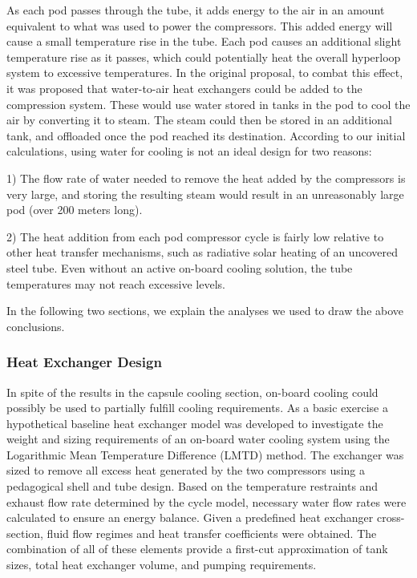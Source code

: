 \documentclass[heading.tex]{subfiles}
\begin{document}
As each pod passes through the tube, it adds energy to the air in an amount equivalent to what was used to power the compressors. This added energy will cause a small temperature rise in the tube. Each pod causes an additional slight temperature rise as it passes, which could potentially heat the overall hyperloop system to excessive temperatures. In the original proposal, to combat this effect, it was proposed that water-to-air heat exchangers could be added to the compression system. These would use water stored in tanks in the pod to cool the air by converting it to steam. The steam could then be stored in an additional tank, and offloaded once the pod reached its destination. According to our initial calculations, using water for cooling is not an ideal design for two reasons:

1) The flow rate of water needed to remove the heat added by the compressors is very large, and storing the resulting steam would result in an unreasonably large pod (over 200 meters long).

2) The heat addition from each pod compressor cycle is fairly low relative to other heat transfer mechanisms, such as radiative solar heating of an uncovered steel tube. Even without an active on-board cooling solution, the tube temperatures may not reach excessive levels.

In the following two sections, we explain the analyses we used to draw the above conclusions.

\subsubsection{Heat Exchanger Design}

In spite of the results in the capsule cooling section, on-board cooling could possibly be used to partially fulfill cooling requirements. As a basic exercise a hypothetical baseline heat exchanger model was developed to investigate the weight and sizing requirements of an on-board water cooling system using the Logarithmic Mean Temperature Difference (LMTD) method. \cite{Cengal} \cite{Turns} The exchanger was sized to remove all excess heat generated by the two compressors using a pedagogical shell and tube design. Based on the temperature restraints and exhaust flow rate determined by the cycle model, necessary water flow rates were calculated to ensure an energy balance. Given a predefined heat exchanger cross-section, fluid flow regimes and heat transfer coefficients were obtained. The combination of all of these elements provide a first-cut approximation of tank sizes, total heat exchanger volume, and pumping requirements.
\end{document}
